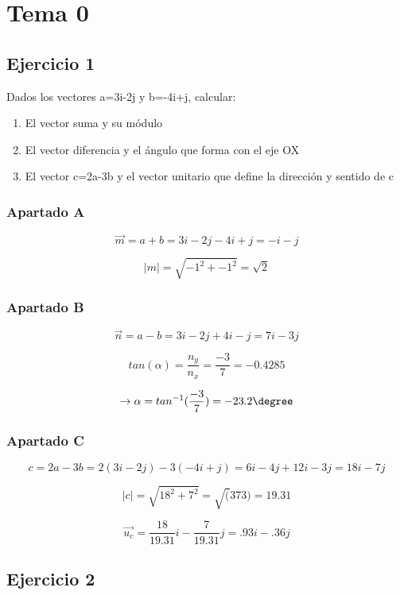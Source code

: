 \section{Tema 0}

\subsection{Ejercicio 1}

Dados los vectores a=3i-2j y b=-4i+j, calcular:
\begin{enumerate}[label=\Alph*)]
  \item El vector suma y su módulo
  \item El vector diferencia y el ángulo que forma con el eje OX
  \item El vector c=2a-3b y el vector unitario que define
        la dirección y sentido de c
\end{enumerate}

\subsubsection{Apartado A}
  $$
  \overrightarrow{m} = a + b = 3i - 2j - 4i + j = -i-j
  $$

  $$
  \left\lvert m\right\rvert = \sqrt{-1^2 + -1^2} = \sqrt{2}
  $$

\subsubsection{Apartado B}
  $$
  \overrightarrow{n} = a - b = 3i - 2j + 4i - j = 7i-3j
  $$

  $$
  tan(\alpha) = \frac{n_y}{n_x} = \frac{-3}{7} = -0.4285
  $$

  $$
  \rightarrow \alpha = tan^{-1}(\frac{-3}{7}) = -23.2\degree 
  $$

\subsubsection{Apartado C}
  $$
  c = 2a - 3b = 2(3i - 2j) - 3(-4i + j)
  = 6i - 4j + 12i - 3j = 18i -7j
  $$

  $$
  \left\lvert c\right\rvert = \sqrt{18^2 + 7^2} = \sqrt(373)
  = 19.31
  $$

  $$
  \overrightarrow{u_c} = \frac{18}{19.31}i - \frac{7}{19.31}j
  = .93i - .36j
  $$

\subsection{Ejercicio 2}


